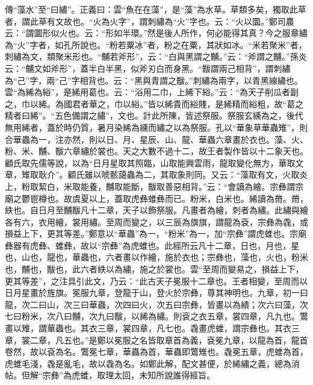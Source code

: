 {\noindent\zhuan{}\fzbyks 傳“藻水”至“曰繡”。正義曰：雲“魚在在藻”，是“藻”為水草。草類多矣，獨取此草者，謂此草有文故也。“火為火字”，謂刺繡為“火”字也。云：“火以圜。”鄭司農云：“謂圜形似火也。云：“形如半環。”然是後人所作，何必能得其真？今之服章繡為“火”字者，如孔所說也。“粉若粟冰”者，粉之在粟，其狀如冰。“米若聚米”者，刺繡為文，類聚米形也。“黼若斧形”，云：“白與黑謂之黼。”云：“斧謂之黼。”孫炎云：“黼文如斧形”，蓋半白半黑，似斧刃白而身黑。“黻謂兩己相背”，謂刺繡為“己”字，兩“己”字相背也。云：“黑與青謂之黻。”刺繡為兩字，以青黑線繡也。雲“為絺為綌”，是絺用葛也。云：“浴用二巾，上絺下綌。”云：“為天子削瓜者副之，巾以絺。為國君者華之，巾以綌。”皆以絺貴而綌賤，是絺精而綌粗，故“葛之精者曰絺”。“五色備謂之繡”，文也。計此所陳，皆述祭服。祭服玄纁為之，後代無用絺者，蓋於時仍質，暑月染絺為纁而繡之以為祭服。孔以“華象草華蟲雉”，則合華蟲為一，注亦然，則以日、月、星辰、山、龍、華蟲六章畫於衣也。藻、火、粉、米、黼、黻六章繡於裳也。天之大數不過十二，故王者製作皆以十二象天也。顧氏取先儒等說，以為“日月星取其照臨，山取能興雲雨，龍取變化無方，華取文章，雉取耿介”。顧氏雖以唬骸藹蟲為二，其取象則同。又云：“藻取有文，火取炎上，粉取絜白，米取能養，黼取能斷，黻取善惡相背。”云：“會讀為繪。宗彝謂宗廟之鬱鬯樽也。故虞夏以上，蓋取虎彝蜼彝而已。粉米，白米也。絺讀為黹。黹，紩也。自日月至黼黻凡十二章，天子以飾祭服。凡畫者為繪，刺者為繡。此繡與繪各有六，衣用繪，裳用繡。至周而變之，以三辰為旗旗，謂龍為袞，宗彝為毳，或損益上下，更其等差。”鄭意以“華蟲”為一，“粉米”為一，加“宗彝”謂虎蜼也。宗廟彝器有虎彝、蜼彝，故以“宗彝”為虎蜼也。此經所云凡十二章，日也，月也，星也，山也，龍也，華蟲也，六者畫以作繪，施於衣也；宗彝也，藻也，火也，粉米也，黼也，黻也，此六者紩以為繡，施之於裳也。雲“至周而變易之，損益上下，更其等差”，之注具引此文，乃云：“此古天子冕服十二章也。王者相變，至周而以日月星畫於旌旗。冕服九章，登龍于山，登火於宗彝，尊其神明也。九章，初一曰龍，次二曰山，次三曰華蟲，次四曰火，次五曰宗彝，皆畫以為繢；次六曰藻，次七曰粉米，次八曰黼，次九曰黻，以絺為繡。則袞之衣五章，裳四章，凡九也。鷩畫以雉，謂華蟲也。其衣三章，裳四章，凡七也。毳畫虎蜼，謂宗彝也。其衣三章，裳二章，凡五也。”是鄭以冕服之名皆取章首為義，袞冕九章，以龍為首，龍首卷然，故以袞為名。鷩冕七章，華蟲為首，華蟲即鷩雉也。毳冕五章，虎蜼為首，虎蜼毛淺，毳是亂毛，故以毳為名。如鄭此解，配文甚便，於絺繡之義，總為消帖。但解“宗彝”為虎蜼，取理太回，未知所說誰得經旨。 \par}

